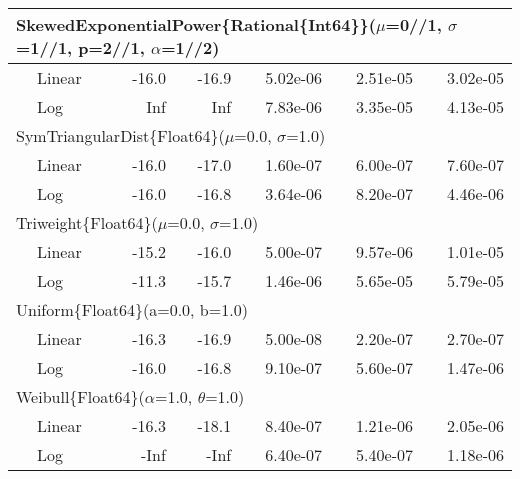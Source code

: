 \begin{tabular}{|llrrrrr|}
\hline
\multicolumn{7}{|l|}{SkewedExponentialPower\{Rational\{Int64\}\}($\mu$=0//1, $\sigma$=1//1, p=2//1, $\alpha$=1//2)}\\ \hline
& Linear & {\color{blue}-16.0} & {\color{blue}-16.9} & {\color{blue}5.02e-06} & {\color{blue}2.51e-05} & {\color{blue}3.02e-05}\\
& Log & Inf & Inf & 7.83e-06 & 3.35e-05 & 4.13e-05\\
\hline
\multicolumn{7}{|l|}{SymTriangularDist\{Float64\}($\mu$=0.0, $\sigma$=1.0)}\\ \hline
& Linear & -16.0 & {\color{blue}-17.0} & {\color{blue}1.60e-07} & {\color{blue}6.00e-07} & {\color{blue}7.60e-07}\\
& Log & {\color{blue}-16.0} & -16.8 & 3.64e-06 & 8.20e-07 & 4.46e-06\\
\hline
\multicolumn{7}{|l|}{Triweight\{Float64\}($\mu$=0.0, $\sigma$=1.0)}\\ \hline
& Linear & {\color{blue}-15.2} & {\color{blue}-16.0} & {\color{blue}5.00e-07} & {\color{blue}9.57e-06} & {\color{blue}1.01e-05}\\
& Log & -11.3 & -15.7 & 1.46e-06 & 5.65e-05 & 5.79e-05\\
\hline
\multicolumn{7}{|l|}{Uniform\{Float64\}(a=0.0, b=1.0)}\\ \hline
& Linear & {\color{blue}-16.3} & {\color{blue}-16.9} & {\color{blue}5.00e-08} & {\color{blue}2.20e-07} & {\color{blue}2.70e-07}\\
& Log & -16.0 & -16.8 & 9.10e-07 & 5.60e-07 & 1.47e-06\\
\hline
\multicolumn{7}{|l|}{Weibull\{Float64\}($\alpha$=1.0, $\theta$=1.0)}\\ \hline
& Linear & -16.3 & -18.1 & 8.40e-07 & 1.21e-06 & 2.05e-06\\
& Log & {\color{blue}-Inf} & {\color{blue}-Inf} & {\color{blue}6.40e-07} & {\color{blue}5.40e-07} & {\color{blue}1.18e-06}\\
\hline
\end{tabular}